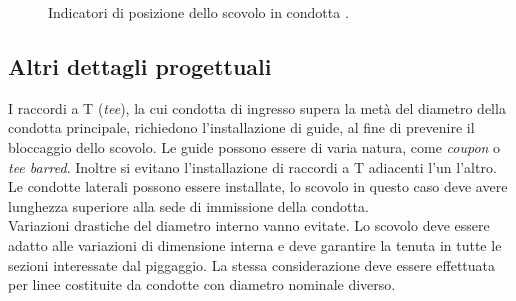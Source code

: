 \begin{figure}[htbp]
    {  \label{fig:indicatori-magnetici}}
    \caption{Indicatori di posizione dello scovolo in condotta \parencite{williamson2015guide}.}
    \label{fig:indicatori-piggaggio}
\end{figure}

\subsection{Altri dettagli progettuali}
I raccordi a T (\textit{tee}), la cui condotta di ingresso supera la metà del diametro della condotta principale, richiedono l'installazione di guide, al fine di prevenire il bloccaggio dello scovolo. Le guide possono essere di varia natura, come \textit{coupon} o \textit{tee barred}. Inoltre si evitano l'installazione di raccordi a T adiacenti l'un l'altro.\\
Le condotte laterali possono essere installate, lo scovolo in questo caso deve avere lunghezza superiore alla sede di immissione della condotta.\\
Variazioni drastiche del diametro interno vanno evitate. Lo scovolo deve essere adatto alle variazioni di dimensione interna e deve garantire la tenuta in tutte le sezioni interessate dal piggaggio. La stessa considerazione deve essere effettuata per linee costituite da condotte con diametro nominale diverso. 


